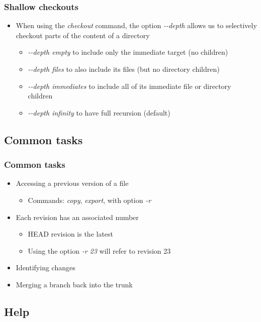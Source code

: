 \documentclass{beamer}
\begin{document}
\frame
{
  \frametitle{Shallow checkouts}
  
  \begin{itemize}
  \item<1-> When using the \textit{checkout} command, the option \textit{-{}-depth} allows us to selectively checkout parts of the content of a directory
  	\begin{itemize}
	\item<2-> \textit{-{}-depth empty} to include only the immediate target (no children)
	\item<3-> \textit{-{}-depth files} to also include its files (but no directory children)
	\item<4-> \textit{-{}-depth immediates} to include all of its immediate file or directory children
	\item<5-> \textit{-{}-depth infinity} to have full recursion (default)
	\end{itemize}
  \end{itemize}
  
}

\subsection{Common tasks}

\frame
{
  \frametitle{Common tasks}
  
  \begin{itemize}
  \item<1-> Accessing a previous version of a file
  	\begin{itemize}
	\item<1-> Commands: \textit{copy}, \textit{export}, with option \textit{-r}
	\end{itemize}
  \item<2-> Each revision has an associated number
  	\begin{itemize}
	\item<2-> HEAD revision is the latest
	\item<2-> Using the option \textit{-r 23} will refer to revision 23
	\end{itemize}
  \item<3-> Identifying changes
  \item<4-> Merging a branch back into the trunk
  \end{itemize}
  
}  

\subsection{Help}
\end{document}
